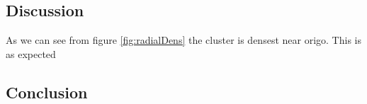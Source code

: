 \documentclass{article}
\begin{document}
\subsection{Discussion}





As we can see from figure \ref{fig:radialDens} the cluster is densest near origo. This is as expected 

\subsection{Conclusion}

\end{document}
